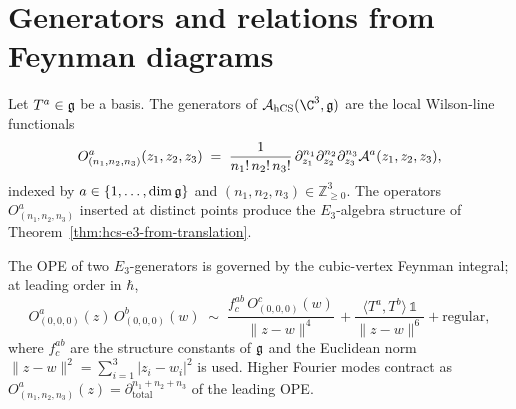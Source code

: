 \section{Generators and relations from Feynman diagrams}
\label{sec:hcs-generators-relations}

\begin{definition}
\label{def:e3-generators}
%
Let $T^a\in\mathfrak{g}$ be a basis. The generators of $\cA_{\hCS}(\C^3,\fg)$
are the local Wilson-line functionals
\begin{equation}
 O^a_{(n_1,n_2,n_3)}(z_1,z_2,z_3)
 \;=\; \frac{1}{n_1!\,n_2!\,n_3!}\,
 \partial_{z_1}^{n_1}\partial_{z_2}^{n_2}\partial_{z_3}^{n_3}
 \mathcal{A}^a(z_1,z_2,z_3),
\end{equation}
indexed by $a \in \{1,\ldots,\dim\mathfrak{g}\}$ and
$(n_1,n_2,n_3)\in\mathbb{Z}_{\ge 0}^3$. The operators
$O^a_{(n_1,n_2,n_3)}$ inserted at distinct points produce the
$E_3$-algebra structure of
Theorem~\ref{thm:hcs-e3-from-translation}.
\end{definition}

\begin{theorem}
\label{thm:hcs-ope-relations}
%
The OPE of two $E_3$-generators is governed by the
cubic-vertex Feynman integral; at leading order in $\hbar$,
\begin{equation}
\label{eq:hcs-ope-leading}
 O^a_{(0,0,0)}(z)\,O^b_{(0,0,0)}(w)
 \;\sim\;
 \frac{f^{ab}_c\,O^c_{(0,0,0)}(w)}
 {\|z-w\|^{4}}\,
 + \frac{\langle T^a,T^b\rangle\,\mathbb{1}}
 {\|z-w\|^{6}}
 + \mathrm{regular},
\end{equation}
where $f^{ab}_c$ are the structure constants of $\mathfrak{g}$ and the
Euclidean norm $\|z-w\|^2 = \sum_{i=1}^3|z_i-w_i|^2$ is used.
Higher
Fourier modes contract as
$O^a_{(n_1,n_2,n_3)}(z) = \partial^{n_1+n_2+n_3}_{\text{total}}$ of
the leading OPE.
\end{theorem}

